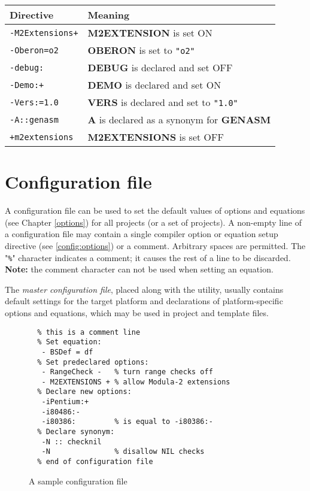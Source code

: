 \Examples
\begin{flushleft}
\begin{tabular}{l|p{8.0cm}}
\bf Directive & \bf Meaning \\ \hline
\verb|-M2Extensions+| & {\bf M2EXTENSION} is set ON \\
\verb|-Oberon=o2|     & {\bf OBERON} is set to \verb|"o2"| \\
\verb|-debug:|        & {\bf DEBUG} is declared and set OFF \\
\verb|-Demo:+|        & {\bf DEMO} is declared  and set ON \\
\verb|-Vers:=1.0|     & {\bf VERS} is declared and set to \verb|"1.0"| \\
\verb|-A::genasm|     & {\bf A} is declared as a synonym for {\bf GENASM} \\
\verb|+m2extensions|  & {\bf M2EXTENSIONS} is set OFF
\end{tabular}
\end{flushleft}

\section{Configuration file}\label{config:cfg}

A configuration file can be used to set the default values of options and
equations (see Chapter \ref{options}) for all projects (or a set of projects).
A non-empty line of a configuration file may contain a single compiler option or
equation setup directive (see \ref{config:options}) or a comment.
Arbitrary spaces are permitted. The "\verb|%|" character indicates a comment;
it causes the rest of a line to be discarded. {\bf Note:} the comment character
can not be used when setting an equation.

The {\it master configuration file},
placed along with the \xc{} utility, usually contains default settings for
the target platform and declarations of platform-specific options and
equations, which may be used in project and template files.

\begin{figure}[htb]
\begin{verbatim}
  % this is a comment line
  % Set equation:
   - BSDef = df
  % Set predeclared options:
   - RangeCheck -   % turn range checks off
   - M2EXTENSIONS + % allow Modula-2 extensions
  % Declare new options:
   -iPentium:+
   -i80486:-
   -i80386:         % is equal to -i80386:-
  % Declare synonym:
   -N :: checknil
   -N               % disallow NIL checks
  % end of configuration file
\end{verbatim}
\caption{A sample configuration file}
\end{figure}

